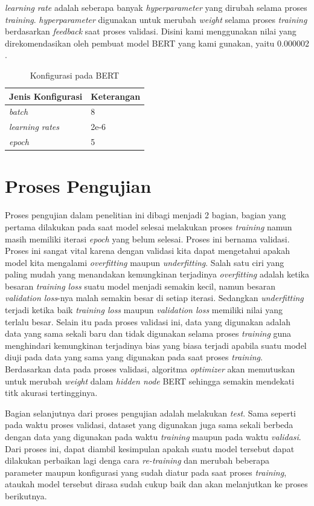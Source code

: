 \textit{learning rate} adalah seberapa banyak \textit{hyperparameter} yang dirubah selama proses \textit{training}. \textit{hyperparameter} digunakan untuk merubah \textit{weight} selama proses \textit{training} berdasarkan \textit{feedback} saat proses validasi. Disini kami menggunakan nilai yang direkomendasikan oleh pembuat model BERT yang kami gunakan, yaitu 0.000002 \cite{koto2020indolem}.

\begin{table}
  \caption{Konfigurasi pada BERT}
  \label{tab:bert_config}
  \centering
  \begin{tabular}{ | l | l | }
    \hline
    \textbf{Jenis Konfigurasi} & \textbf{Keterangan} \\ \hline
    \textit{batch}             & 8                   \\ \hline
    \textit{learning rates}    & 2e-6                \\ \hline
    \textit{epoch}             & 5                   \\ \hline
  \end{tabular}
\end{table}


\section{Proses Pengujian}

Proses pengujian dalam penelitian ini dibagi menjadi 2 bagian, bagian yang pertama dilakukan pada saat model selesai melakukan proses \textit{training} namun masih memiliki iterasi \textit{epoch} yang belum selesai. Proses ini bernama validasi. Proses ini sangat vital karena dengan validasi kita dapat mengetahui apakah model kita mengalami \textit{overfitting} maupun \textit{underfitting}. Salah satu ciri yang paling mudah yang menandakan kemungkinan terjadinya \textit{overfitting} adalah ketika besaran \textit{training loss} suatu model menjadi semakin kecil, namun besaran \textit{validation loss}-nya malah semakin besar di setiap iterasi. Sedangkan \textit{underfitting} terjadi ketika baik \textit{training loss} maupun \textit{validation loss} memiliki nilai yang terlalu besar. Selain itu pada proses validasi ini, data yang digunakan adalah data yang sama sekali baru dan tidak digunakan selama proses \textit{training} guna menghindari kemungkinan terjadinya bias yang biasa terjadi apabila suatu model diuji pada data yang sama yang digunakan pada saat proses \textit{training}. Berdasarkan data pada proses validasi, algoritma \textit{optimizer} akan memutuskan untuk merubah \textit{weight} dalam \textit{hidden node} BERT sehingga semakin mendekati titk akurasi tertingginya.

Bagian selanjutnya dari proses pengujian adalah melakukan \textit{test}. Sama seperti pada waktu proses validasi, dataset yang digunakan juga sama sekali berbeda dengan data yang digunakan pada waktu \textit{training} maupun pada waktu \textit{validasi}. Dari proses ini, dapat diambil kesimpulan apakah suatu model tersebut dapat dilakukan perbaikan lagi denga cara \textit{re-training} dan merubah beberapa parameter maupun konfigurasi yang sudah diatur pada saat proses \textit{training}, ataukah model tersebut dirasa sudah cukup baik dan akan melanjutkan ke proses berikutnya.
